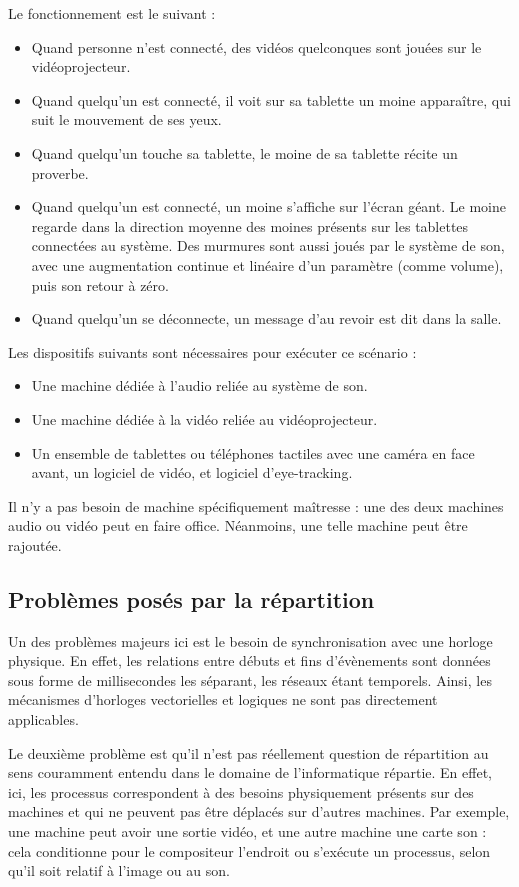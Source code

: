 Le fonctionnement est le suivant : 
\begin{itemize}
	\item Quand personne n'est connecté, des vidéos quelconques sont jouées sur le vidéoprojecteur.
	\item Quand quelqu'un est connecté, il voit sur sa tablette un moine apparaître, qui suit le mouvement de ses yeux.
	\item Quand quelqu'un touche sa tablette, le moine de sa tablette récite un proverbe.
	\item Quand quelqu'un est connecté, un moine s'affiche sur l'écran géant. Le moine regarde dans la direction moyenne des moines présents sur les tablettes connectées au système. Des murmures sont aussi joués par le système de son, avec une augmentation continue et linéaire d'un paramètre (comme volume), puis son retour à zéro.
	\item Quand quelqu'un se déconnecte, un message d'au revoir est dit dans la salle.
\end{itemize}

Les dispositifs suivants sont nécessaires pour exécuter ce scénario : 
\begin{itemize}
	\item Une machine dédiée à l'audio reliée au système de son.
	\item Une machine dédiée à la vidéo reliée au vidéoprojecteur.
	\item Un ensemble de tablettes ou téléphones tactiles avec une caméra en face avant, un logiciel de vidéo, et logiciel d'eye-tracking.
\end{itemize}

Il n'y a pas besoin de machine spécifiquement maîtresse : une des deux machines audio ou vidéo peut en faire office.
Néanmoins, une telle machine peut être rajoutée.
\subsection{Problèmes posés par la répartition}
Un des problèmes majeurs ici est le besoin de synchronisation avec une horloge physique. En effet, les relations entre débuts et fins d'évènements sont données sous forme de millisecondes les séparant, les réseaux étant temporels. Ainsi, les mécanismes d'horloges vectorielles et logiques ne sont pas directement applicables.

Le deuxième problème est qu'il n'est pas réellement question de répartition au sens couramment entendu dans le domaine de l'informatique répartie. En effet, ici, les processus correspondent à des besoins physiquement présents sur des machines et qui ne peuvent pas être déplacés sur d'autres machines. Par exemple, une machine peut avoir une sortie vidéo, et une autre machine une carte son : cela conditionne pour le compositeur l'endroit ou s'exécute un processus, selon qu'il soit relatif à l'image ou au son.

